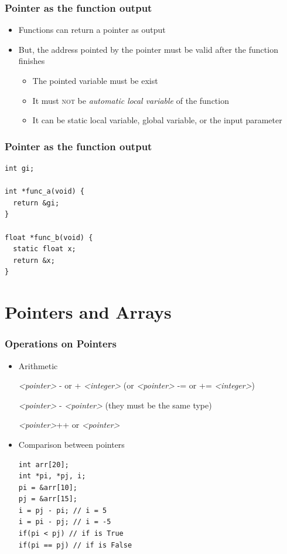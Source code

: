 \documentclass{../c-lecture}
\begin{document}
\begin{frame}
  \frametitle{Pointer as the function output}
  \begin{itemize}
    \item Functions can return a pointer as output
    \item
      But, the address pointed by the pointer must be valid after the function
      finishes

    \begin{itemize}
      \item The pointed variable must be exist
      \item
        It must \textsc{\color{RubineRed} not} be
        \textit{\color{Orange} automatic local variable} of the function

      \item
        It can be static local variable, global variable, or the input parameter

    \end{itemize}
  \end{itemize}
\end{frame}

\begin{frame}[fragile]
  \frametitle{Pointer as the function output}
  \begin{verbatim}
int gi;

int *func_a(void) {
  return &gi;
}

float *func_b(void) {
  static float x;
  return &x;
}
  \end{verbatim}
\end{frame}

\section{Pointers and Arrays}

\begin{frame}[fragile]
  \frametitle{Operations on Pointers}
  \begin{itemize}
    \item Arithmetic
    \begin{block}{}
      \textit{\color{YellowOrange}<pointer>} - or +
      \textit{\color{YellowOrange}<integer>} (or
      \textit{\color{YellowOrange}<pointer>} -= or +=
      \textit{\color{YellowOrange}<integer>})

      \textit{\color{YellowOrange}<pointer>} -
      \textit{\color{YellowOrange}<pointer>} (they must be the same
      type)

      \textit{\color{YellowOrange}<pointer>}++ or
      \textit{\color{YellowOrange}<pointer>}\-\-
    \end{block}
    \item Comparison between pointers
    \begin{verbatim}
int arr[20];
int *pi, *pj, i;
pi = &arr[10];
pj = &arr[15];
i = pj - pi; // i = 5
i = pi - pj; // i = -5
if(pi < pj) // if is True
if(pi == pj) // if is False
    \end{verbatim}
  \end{itemize}
\end{frame}
\end{document}
